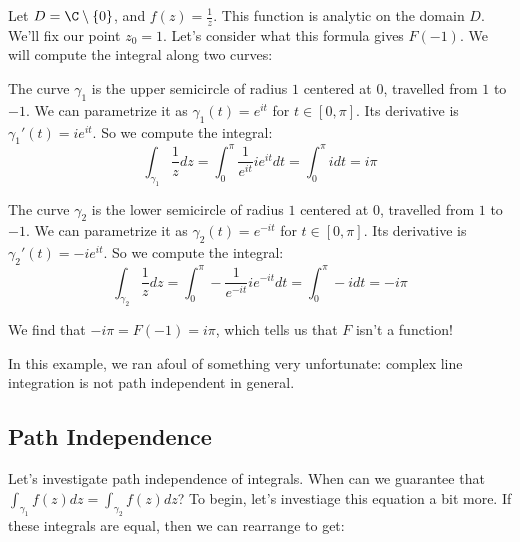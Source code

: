\begin{ex}{}{} Let $D = \C\setminus\{0\}$, and $f(z) = \frac{1}{z}$. This function is analytic on the domain $D$. We'll fix our point $z_0 =1$. Let's consider what this formula gives $F(-1)$. We will compute the integral along two curves:

\begin{center}
\end{center}

The curve $\gamma_1$ is the upper semicircle of radius $1$ centered at $0$, travelled from $1$ to $-1$. We can parametrize it as $\gamma_1(t) = e^{it}$ for $t\in[0,\pi]$. Its derivative is $\gamma_1'(t) = ie^{it}$. So we compute the integral:
$$\int_{\gamma_1}\frac{1}{z}dz = \int_{0}^\pi \frac{1}{e^{it}}ie^{it}dt = \int_0^\pi idt = i\pi$$


The curve $\gamma_2$ is the lower semicircle of radius $1$ centered at $0$, travelled from $1$ to $-1$. We can parametrize it as $\gamma_2(t) = e^{-it}$ for $t\in[0,\pi]$. Its derivative is $\gamma_2'(t) = -ie^{it}$. So we compute the integral:
$$\int_{\gamma_2}\frac{1}{z}dz = \int_{0}^\pi -\frac{1}{e^{-it}}ie^{-it}dt = \int_0^\pi -idt = -i\pi$$

We find that $-i\pi = F(-1) = i\pi$, which tells us that $F$ isn't a function!
\end{ex}

In this example, we ran afoul of something very unfortunate: complex line integration is not path independent in general.

\subsection{Path Independence}

Let's investigate path independence of integrals. When can we guarantee that $\int_{\gamma_1}f(z)dz = \int_{\gamma_2}f(z)dz$? To begin, let's investiage this equation a bit more. If these integrals are equal, then we can rearrange to get:

